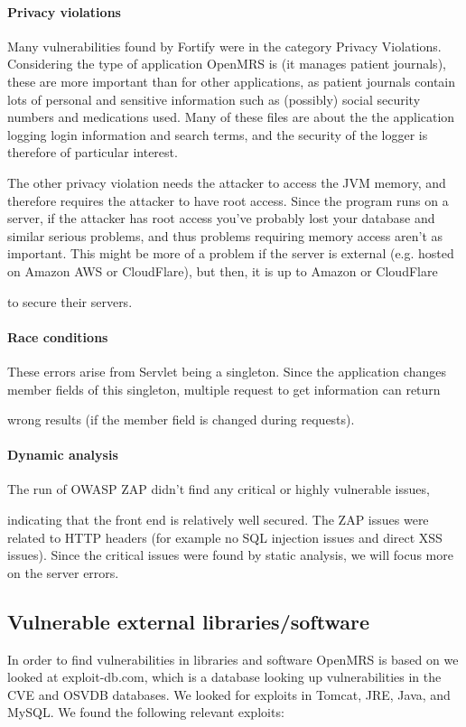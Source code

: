 \documentclass{report} %
\begin{document}
\paragraph{Privacy violations}
Many vulnerabilities found by Fortify were in the category Privacy Violations.
Considering the type of application OpenMRS is (it manages patient journals),
these are more important than for other applications, as patient journals
contain lots of personal and sensitive information such as (possibly) social security
numbers and medications used. Many of these files are about the the application
logging login information and search terms, and the security of the logger is therefore of
particular interest.

The other privacy violation needs the attacker to access the JVM memory, and
therefore requires the attacker to have root access. Since the program runs on a
server, if the attacker has root access you've probably lost your database and
similar serious problems, and thus problems requiring memory access aren't as
important. This might be more of a problem if the server is external (e.g.
hosted on Amazon AWS or CloudFlare), but then, it is up to Amazon or CloudFlare

to secure their servers.

\paragraph{Race conditions}
These errors arise from Servlet being a singleton. Since the application changes
member fields of this singleton, multiple request to get information can return


wrong results (if the member field is changed during requests). 

\paragraph{Dynamic analysis}
The run of OWASP ZAP didn't find any critical or highly vulnerable issues,

indicating that the front end is relatively well secured. The ZAP issues were
related to HTTP headers (for example no SQL injection issues and direct XSS
issues). Since the critical issues were found by static analysis, we will focus
more on the server errors.

\subsection{Vulnerable external libraries/software}
In order to find vulnerabilities in libraries and software OpenMRS is based on
we looked at exploit-db.com, which is a database looking up vulnerabilities in
the CVE and OSVDB databases. We looked for exploits in Tomcat, JRE, Java, and
MySQL. We found the following relevant exploits:
\end{document}
